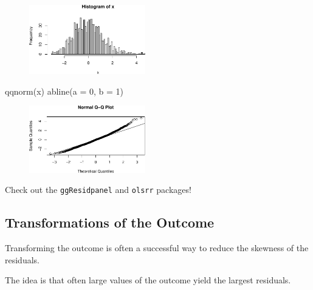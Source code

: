 \documentclass[
  letterpaper,
  DIV=11,
  numbers=noendperiod]{scrreport}
\newenvironment{Shaded}{\begin{snugshade}}{\end{snugshade}}
\newcommand{\AttributeTok}[1]{\textcolor[rgb]{0.40,0.45,0.13}{#1}}
\newcommand{\DecValTok}[1]{\textcolor[rgb]{0.68,0.00,0.00}{#1}}
\newcommand{\FunctionTok}[1]{\textcolor[rgb]{0.28,0.35,0.67}{#1}}
\newcommand{\NormalTok}[1]{\textcolor[rgb]{0.00,0.23,0.31}{#1}}
\begin{document}
\begin{figure}[H]

{\centering \includegraphics[width=0.45\textwidth,height=\textheight]{week4/week4_files/figure-pdf/unnamed-chunk-3-5.pdf}

}

\end{figure}

\begin{Shaded}
\begin{Highlighting}[]
\FunctionTok{qqnorm}\NormalTok{(x)}
\FunctionTok{abline}\NormalTok{(}\AttributeTok{a =} \DecValTok{0}\NormalTok{, }\AttributeTok{b =} \DecValTok{1}\NormalTok{)}
\end{Highlighting}
\end{Shaded}

\begin{figure}[H]

{\centering \includegraphics[width=0.45\textwidth,height=\textheight]{week4/week4_files/figure-pdf/unnamed-chunk-3-6.pdf}

}

\end{figure}

Check out the \texttt{ggResidpanel} and \texttt{olsrr} packages!

\hypertarget{transformations-of-the-outcome}{%
\subsection{Transformations of the
Outcome}\label{transformations-of-the-outcome}}

Transforming the outcome is often a successful way to reduce the
skewness of the residuals.

The idea is that often large values of the outcome yield the largest
residuals.
\end{document}
